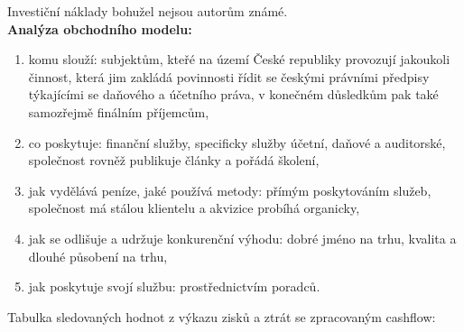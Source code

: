 Investiční náklady bohužel nejsou autorům známé.\\

\noindent\textbf{Analýza obchodního modelu:}

\begin{enumerate}
	\item komu slouží: subjektům, kteřé na území České republiky provozují jakoukoli činnost, která jim zakládá povinnosti řídit se českými právními předpisy týkajícími se daňového a účetního práva, v konečném důsledkům pak také samozřejmě finálním příjemcům,
	\item co poskytuje: finanční služby, specificky služby účetní, daňové a auditorské, společnost rovněž publikuje články a pořádá školení,
	\item jak vydělává peníze, jaké používá metody: přímým poskytováním služeb, společnost má stálou klientelu a akvizice probíhá organicky,
	\item jak se odlišuje a udržuje konkurenční výhodu: dobré jméno na trhu, kvalita a dlouhé působení na trhu,
	\item jak poskytuje svojí službu: prostřednictvím poradců.
\end{enumerate}

\newpage

Tabulka sledovaných hodnot z výkazu zisků a ztrát se zpracovaným cashflow:\\

